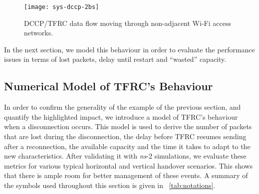 \documentclass[twocolumn]{nictatechreport}
\newcommand{\ns}{\textit{ns}}
\begin{document}
\begin{figure}[tb]
  \centering
  \texttt{[image: sys-dccp-2bs]}

  \caption[DCCP/TFRC data flow moving through non-adjacent Wi-Fi access
  networks]{DCCP/TFRC data flow moving through non-adjacent Wi-Fi access
  networks.}

  \label{fig:sys-dccp-2bs}
\end{figure}

In the next section, we model this behaviour in order to evaluate the performance
issues in terms of lost packets, delay until restart and ``wasted'' capacity.



\subsection{Numerical Model of TFRC's Behaviour}
\label{sec:model}

In order to confirm the generality of the example of the previous section, and
quantify the highlighted impact, we
introduce a model of TFRC's behaviour when a disconnection occurs. This model is
used to derive the number of packets that are lost during the disconnection, the
delay before TFRC resumes sending after a reconnection, the available capacity
and the time it takes to adapt to the new characteristics. After validating it
with \ns-2 simulations, we evaluate these metrics for various typical horizontal
and vertical handover scenarios. This shows that there is ample room for better
management of these events. A summary of the symbols used throughout this
section is given in \tablename~\ref{tab:notations}.
\end{document}
